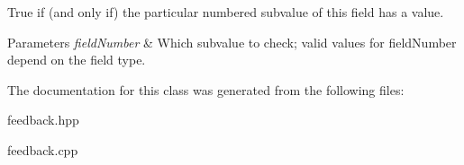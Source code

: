 True if (and only if) the particular numbered subvalue of this field has a value. 


\begin{DoxyParams}{Parameters}
{\em field\+Number} & Which subvalue to check; valid values for field\+Number depend on the field type. \\
\hline
\end{DoxyParams}


The documentation for this class was generated from the following files\+:\begin{DoxyCompactItemize}
\item 
feedback.\+hpp\item 
feedback.\+cpp\end{DoxyCompactItemize}
